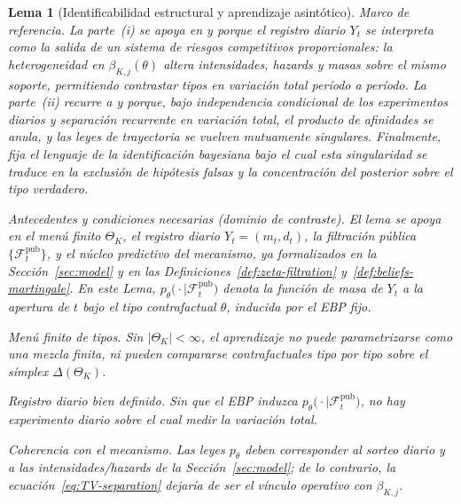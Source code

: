 \documentclass[review,authoryear,12pt]{elsarticle}
\theoremstyle{plain}
\newtheorem{lemma}[theorem]{Lema}
\theoremstyle{definition}
\newcommand{\ThetaK}{\Theta_K}
\newcommand{\1}{\mathbf{1}}
\begin{document}
\begin{lemma}[Identificabilidad estructural y aprendizaje asintótico]\label{lem:hazard-separation}
\normalfont
Marco de referencia. La parte~\textup{(i)} se apoya en \citet{Cox1972} y \citet{Bradburn2003} porque el registro diario $Y_t$ se interpreta como la salida de un sistema de riesgos competitivos proporcionales: la heterogeneidad en $\beta_{K,j}(\theta)$ altera intensidades, hazards y masas sobre el mismo soporte, permitiendo contrastar tipos en variación total período a período. La parte~\textup{(ii)} recurre a \citet{Kakutani1948} y \citet{Shiryaev2019Probability} porque, bajo independencia condicional de los experimentos diarios y separación recurrente en variación total, el producto de afinidades se anula, y las leyes de trayectoria se vuelven mutuamente singulares. Finalmente, \citet{Schervish1995Theory} fija el lenguaje de la identificación bayesiana bajo el cual esta singularidad se traduce en la exclusión de hipótesis falsas y la concentración del posterior sobre el tipo verdadero.

\medskip
\noindent Antecedentes y condiciones necesarias \textup{(}dominio de contraste\textup{)}.
El lema se apoya en el menú finito $\ThetaK$, el registro diario $Y_t=(m_t,d_t)$, la filtración pública $\{\mathcal{F}_t^{\mathrm{pub}}\}$, y el núcleo predictivo del mecanismo, ya formalizados en la Sección~\ref{sec:model} y en las Definiciones~\ref{def:zeta-filtration} y~\ref{def:beliefs-martingale}. En este Lema, $p_\theta\bigl(\cdot\mid \mathcal{F}_t^{\mathrm{pub}}\bigr)$ denota la función de masa de $Y_t$ a la apertura de $t$ bajo el tipo contrafactual $\theta$, inducida por el EBP fijo.
\begin{list}{}{%
  \setlength{\leftmargin}{2.25em}%
  \setlength{\labelwidth}{2.25em}%
  \setlength{\labelsep}{0.45em}%
  \setlength{\itemsep}{0.35em}%
  \setlength{\parsep}{0pt}%
  \setlength{\topsep}{0.25em}%
}
\item[\textup{(N1)}] \textup{Menú finito de tipos.}\quad
Sin $\lvert\ThetaK\rvert<\infty$, el aprendizaje no puede parametrizarse como una mezcla finita, ni pueden compararse contrafactuales tipo por tipo sobre el símplex $\Delta(\ThetaK)$.
\item[\textup{(N2)}] \textup{Registro diario bien definido.}\quad
Sin que el EBP induzca $p_\theta\bigl(\cdot\mid\mathcal{F}_t^{\mathrm{pub}}\bigr)$, no hay experimento diario sobre el cual medir la variación total.
\item[\textup{(N3)}] \textup{Coherencia con el mecanismo.}\quad
Las leyes $p_\theta$ deben corresponder al sorteo diario y a las intensidades/hazards de la Sección~\ref{sec:model}; de lo contrario, la ecuación~\eqref{eq:TV-separation} dejaría de ser el vínculo operativo con $\beta_{K,j}$.
\end{list}


\end{lemma}
\end{document}
